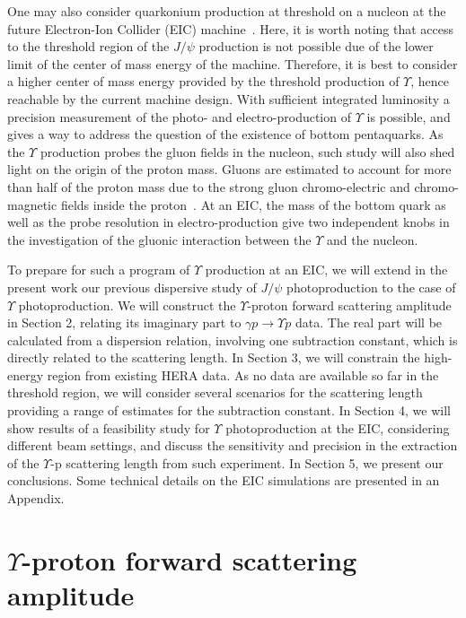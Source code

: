 \documentclass[prd,amsmath,%
twocolumn,floatfix,amssymb, preprintnumbers, nofootinbib, superscriptaddress]{revtex4}
\begin{document}
One may also consider quarkonium production at threshold on a nucleon at the future Electron-Ion Collider (EIC) 
machine~\cite{Accardi:2012qut}. Here, it is worth noting that access to the threshold region of the $J/\psi$ production is not possible due of the lower limit of the center of mass energy of the machine. Therefore, it is best to consider a higher center of mass energy provided by the threshold production of $\Upsilon$, hence reachable by the current machine design. With sufficient integrated luminosity a precision measurement of the photo- and electro-production of $\Upsilon$ is possible, and gives a way to address the question of the existence of bottom pentaquarks. As the $\Upsilon$ production probes the gluon fields in the nucleon, such study will also shed light on the origin of the proton mass. Gluons are estimated to account for more than half of the proton mass due to the strong gluon chromo-electric and chromo-magnetic fields inside the proton~\cite{Ji:1994av}. 
At an EIC, the mass of the bottom quark as well as  the probe resolution in electro-production give two independent knobs in the investigation of the gluonic interaction between the $\Upsilon$ and the nucleon.  

To prepare for such a program of $\Upsilon$ production at an EIC, we will extend in the present work our previous dispersive study of $J/\psi$ photoproduction to the case of $\Upsilon$ photoproduction. We will construct the $\Upsilon$-proton forward scattering amplitude in Section 2, relating  
its imaginary part to $\gamma p \to \Upsilon p$ data. The real part will be calculated from a dispersion relation, involving one subtraction constant, which is directly related to the scattering length. 
In Section 3, we will constrain the high-energy region from existing HERA data. As no data are available so far in the threshold region, we will consider several scenarios for the scattering length providing a range of estimates for the subtraction constant. 
In Section 4, we will show results of a feasibility study for $\Upsilon$ photoproduction at the EIC, considering different beam settings, and discuss the sensitivity and precision in the extraction of the 
$\Upsilon$-p scattering length from such experiment. 
In Section 5, we present our conclusions. Some technical details on the EIC simulations are presented in an Appendix. 

\section{$\Upsilon$-proton forward scattering amplitude}
\end{document}
